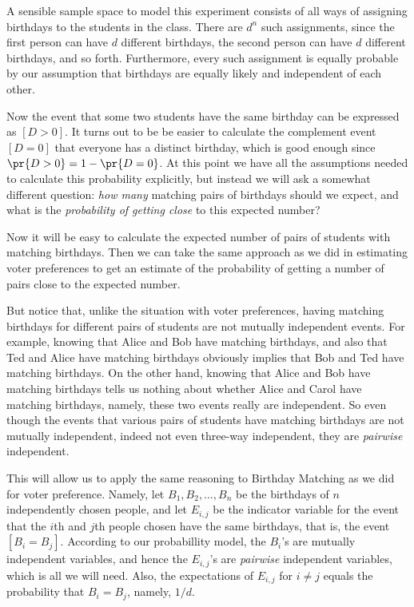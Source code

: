 A sensible sample space to model this experiment consists of all ways of
assigning birthdays to the students in the class.  There are $d^n$ such
assignments, since the first person can have $d$ different birthdays, the
second person can have $d$ different birthdays, and so forth.
Furthermore, every such assignment is equally probable by our assumption
that birthdays are equally likely and independent of each other.

Now the event that some two students have the same birthday can be
expressed as $[D>0]$.  It turns out to be be easier to calculate the
complement event $[D=0]$ that everyone has a distinct birthday, which is
good enough since $\pr{D>0} = 1 - \pr{D=0}$.  At this point we have all the
assumptions needed to calculate this probability explicitly, but instead we
will ask a somewhat different question: \emph{how many} matching pairs of
birthdays should we expect, and what is the \emph{probability of getting
close} to this expected number?

Now it will be easy to calculate the expected number of pairs of students
with matching birthdays.  Then we can take the same approach as we did in
estimating voter preferences to get an estimate of the probability of
getting a number of pairs close to the expected number.

But notice that, unlike the situation with voter preferences, having
matching birthdays for different pairs of students are not mutually
independent events.  For example, knowing that Alice and Bob have matching
birthdays, and also that Ted and Alice have matching birthdays obviously
implies that Bob and Ted have matching birthdays.  On the other hand,
knowing that Alice and Bob have matching birthdays tells us nothing about
whether Alice and Carol have matching birthdays, namely, these two events
really are independent.  So even though the events that various pairs of
students have matching birthdays are not mutually independent, indeed not
even three-way independent, they are \emph{pairwise} independent.


This will allow us to apply the same reasoning to Birthday Matching as we
did for voter preference.  Namely, let $B_1,B_2,\dots,B_n$ be the birthdays
of $n$ independently chosen people, and let $E_{i,j}$ be the indicator
variable for the event that the $i$th and $j$th people chosen have the same
birthdays, that is, the event $[B_i = B_j]$.  According to our probabillity
model, the $B_i$'s are mutually independent variables, and hence the
$E_{i,j}$'s are \emph{pairwise} independent variables, which is all we will
need.  Also, the expectations of $E_{i,j}$ for $i \neq j$ equals the
probability that $B_i = B_j$, namely, $1/d$.

